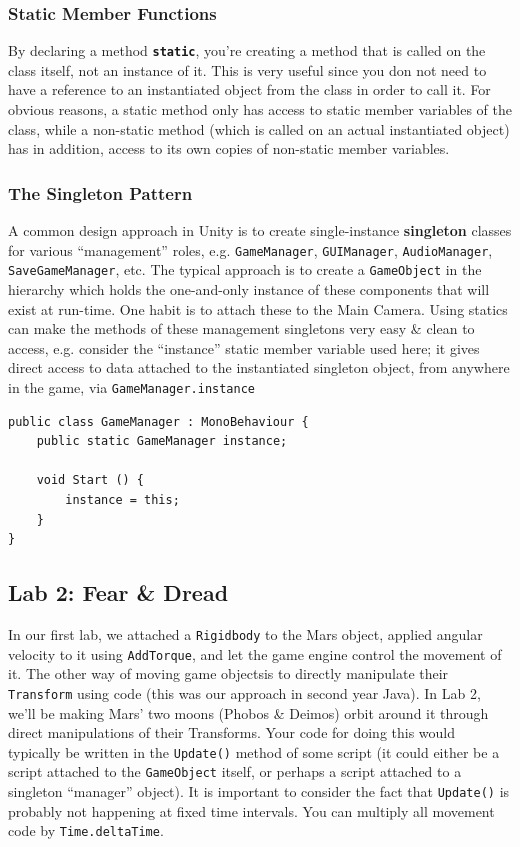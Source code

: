 \documentclass[a4paper,11pt]{article}
\begin{document}
\subsubsection{Static Member Functions}
By declaring a method \textbf{\texttt{static}}, you're creating a method that is called on the class itself, not an instance of 
it. 
This is very useful since you don not need to have a reference to an instantiated object from the class in order to call it. 
For obvious reasons, a static method only has access to static member variables of the class, while a non-static method 
(which is called on an actual instantiated object) has in addition, access to its own copies of non-static member variables.

\subsubsection{The Singleton Pattern}
A common design approach in Unity is to create single-instance \textbf{singleton} classes for various ``management'' roles,
e.g. \verb|GameManager|, \verb|GUIManager|, \verb|AudioManager|, \verb|SaveGameManager|, etc.
The typical approach is to create a \verb|GameObject| in the hierarchy which holds the one-and-only instance of these 
components that will exist at run-time.
One habit is to attach these to the Main Camera.
Using statics can make the methods of these management singletons very easy \& clean to access, e.g. consider the ``instance'' 
static member variable used here; it gives direct access to data attached to the instantiated singleton object, from anywhere 
in the game, via \verb|GameManager.instance|
\begin{verbatim}
public class GameManager : MonoBehaviour {
    public static GameManager instance;

    void Start () {
        instance = this;
    }
}
\end{verbatim}

\subsection{Lab 2: Fear \& Dread}
In our first lab, we attached a \verb|Rigidbody| to the Mars object, applied angular velocity to it using \verb|AddTorque|, 
and let the game engine control the movement of it. 
The other way of moving game objectsis to directly manipulate their \verb|Transform| using code (this was our approach in
second year Java).
In Lab 2, we'll be making Mars' two moons (Phobos \& Deimos) orbit around it through direct manipulations of their Transforms. 
Your code for doing this would typically be written in the \verb|Update()| method of some script (it could either be a 
script attached to the \verb|GameObject| itself, or perhaps a script attached to a singleton ``manager'' object). 
It is important to consider the fact that \verb|Update()| is probably not happening at fixed time intervals. 
You can multiply all movement code by \verb|Time.deltaTime|.
\end{document}
